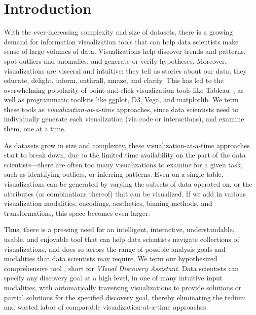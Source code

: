 \section{Introduction}%

\par 
With the ever-increasing complexity 
and size of datasets,
there is a growing demand for 
information visualization tools
that can help data scientists make sense of large
volumes of data.
Visualizations help discover 
trends and patterns, 
spot outliers and anomalies, 
and generate or verify hypotheses.
Moreover, 
visualizations are visceral and intuitive: 
they tell us stories about our data; 
they educate, delight, inform, 
enthrall, amaze, and clarify.
This has led to the overwhelming popularity
of point-and-click visualization tools like Tableau~\cite{Stolte2002},
as well as programmatic toolkits like ggplot, D3, Vega, and matplotlib. 
We term these tools as {\em visualization-at-a-time} approaches, since
data scientists need to individually 
generate each visualization (via code or interactions),
and examine them, 
one at a time.


\par
As datasets grow in size and complexity, 
these visualization-at-a-time approaches start to break down,
due to the limited time availability on the 
part of the data scientists---there 
are often too many visualizations to examine for a given 
task, such as identifying outliers, or inferring patterns. 
Even on a single table, 
visualizations can be generated
by varying the subsets of data operated on, 
or the attributes (or combinations
thereof) that can be visualized. 
If we add in various visualization modalities, encodings,
aesthetics, binning methods, and transformations,
this space becomes even larger.


\par
Thus, there is a pressing need for an 
intelligent,
interactive, understandable, usable, and
enjoyable tool that can help 
data scientists navigate
collections of visualizations,
and does so across the range of possible analysis
goals and modalities that data scientists may 
require.
We term our hypothesized comprehensive tool \vida,
short for {\em VIsual Discovery Assistant}.
Data scientists can specify any discovery
goal at a high level,
in one of many intuitive input modalities,
with \vida 
automatically 
traversing visualizations to provide
solutions or partial solutions for the
specified discovery goal, thereby
eliminating the tedium and wasted
labor of comparable visualization-at-a-time 
approaches.


